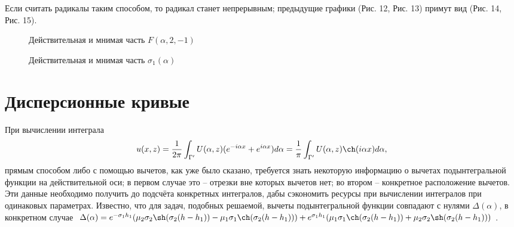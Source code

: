 \documentclass[a4paper, 12pt]{article}
\newcommand{\s}[1]{\sigma_{#1}}
\newcommand{\m}[1]{\mu_{#1}}
\newcommand{\E}[2]{e^{#1 #2}}
\begin{document}
Если считать радикалы таким способом, то радикал станет непрерывным; предыдущие графики (Рис. 12, Рис. 13) примут вид (Рис. 14, Рис. 15).
\begin{figure}[h!]
\noindent{}
\caption{Действительная и мнимая часть $F(\alpha,2,-1)$}
\label{figCurves}
\end{figure}

\begin{figure}[h!]
\noindent{}
\caption{Действительная и мнимая часть $\sigma_1 (\alpha)$}
\label{figCurves}
\end{figure}


\newpage
\section{Дисперсионные кривые}
При вычислении интеграла
$$u(x,z) =\frac{1}{2\pi} \int_{\Gamma'} U(\alpha, z) (e^{-i \alpha x}+e^{i \alpha x}) d\alpha=\frac{1}{\pi}\int_{\Gamma'} U(\alpha, z) \ch (i \alpha x) d\alpha,$$
прямым способом либо с помощью вычетов, как уже было сказано, требуется знать некоторую информацию о вычетах подынтегральной функции на действительной оси; в первом случае это -- отрезки вне которых вычетов нет; во втором -- конкретное расположение вычетов. Эти данные необходимо получить до подсчёта конкретных интегралов, дабы сэкономить ресурсы при вычислении интегралов при одинаковых параметрах. Известно, что для задач, подобных решаемой, вычеты подынтегральной функции совпадают с нулями $\Delta(\alpha)$, в конкретном случае $ \Delta(\alpha)=\E{-\s{1}}{h_1}(\m{2}\s{2}\sh(\s{2}(h-h_1))-\m{1}\s{1}\ch(\s{2}(h-h_1)))+\E{\s{1}}{h_1}(\m{1}\s{1}\ch(\s{2}(h-h_1))+\m{2}\s{2}\sh(\s{2}(h-h_1)))$. 
\end{document}
